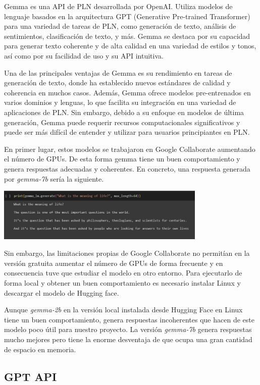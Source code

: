 Gemma es una API de PLN desarrollada por OpenAI. Utiliza modelos de lenguaje basados en la arquitectura GPT (Generative Pre-trained Transformer) para una variedad de tareas de PLN, como generación de texto, análisis de sentimientos, clasificación de texto, y más. Gemma se destaca por su capacidad para generar texto coherente y de alta calidad en una variedad de estilos y tonos, así como por su facilidad de uso y su API intuitiva.

Una de las principales ventajas de Gemma es su rendimiento en tareas de generación de texto, donde ha establecido nuevos estándares de calidad y coherencia en muchos casos. Además, Gemma ofrece modelos pre-entrenados en varios dominios y lenguas, lo que facilita su integración en una variedad de aplicaciones de PLN. Sin embargo, debido a su enfoque en modelos de última generación, Gemma puede requerir recursos computacionales significativos y puede ser más difícil de entender y utilizar para usuarios principiantes en PLN.


En primer lugar, estos modelos se trabajaron en Google Collaborate aumentando el número de GPUs. De esta forma gemma tiene un buen comportamiento y genera respuestas adecuadas y coherentes. En concreto, una respuesta generada por \textit{gemma-7b} sería la siguiente.
\begin{center}
	\includegraphics[width=0.75\textwidth]{Imagenes/gemma (1)}
\end{center}
Sin embargo, las limitaciones propias de Google Collaborate no permitían en la versión gratuita aumentar el número de GPUs de forma frecuente y en consecuencia tuve que estudiar el modelo en otro entorno. Para ejecutarlo de forma local y obtener un buen comportamiento es necesario instalar Linux y descargar el modelo de Hugging face. 

Aunque \textit{gemma-2b} en la versión local instalada desde Hugging Face en Linux tiene un buen comportamiento, genera respuestas incoherentes que hacen de este modelo poco útil para nuestro proyecto. La versión \textit{gemma-7b} genera respuestas mucho mejores pero tiene la enorme desventaja de que ocupa una gran cantidad de espacio en memoria.

\subsection{GPT API}

